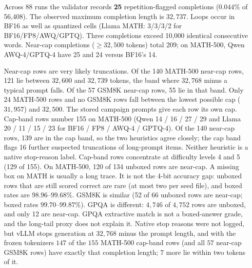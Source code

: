 \documentclass[11pt,a4paper]{article}
\begin{document}
Across 88 runs the validator records \textbf{25} repetition-flagged completions ($0.044\%$ of 56{,}408). The observed maximum completion length is $32{,}737$. Loops occur in BF16 as well as quantized cells (Llama MATH: 3/3/3/2 for BF16/FP8/AWQ/GPTQ). Three completions exceed 10{,}000 identical consecutive words. Near-cap completions ($\ge 32{,}500$ tokens) total 209; on MATH-500, Qwen AWQ-4/GPTQ-4 have 25 and 24 versus BF16's 14.

Near-cap rows are very likely truncations. Of the 140 MATH-500 near-cap rows, 121 lie between $32{,}600$ and $32{,}739$ tokens, the band where $32{,}768$ minus a typical prompt falls. Of the 57 GSM8K near-cap rows, 55 lie in that band. Only 24 MATH-500 rows and no GSM8K rows fall between the lowest possible cap ($31{,}957$) and $32{,}500$. The stored campaign prompts give each row its own cap. Cap-band rows number 155 on MATH-500 (Qwen 14 / 16 / 27 / 29 and Llama 20 / 11 / 15 / 23 for BF16 / FP8 / AWQ-4 / GPTQ-4). Of the 140 near-cap rows, 139 are in the cap band, so the two heuristics agree closely; the cap band flags 16 further suspected truncations of long-prompt items. Neither heuristic is a native stop-reason label. Cap-band rows concentrate at difficulty levels 4 and 5 (129 of 155). On MATH-500, 120 of 134 unboxed rows are near-cap. A missing box on MATH is usually a long trace. It is not the 4-bit accuracy gap: unboxed rows that are still scored correct are rare (at most two per seed file), and boxed rates are $98.96$--$99.68\%$. GSM8K is similar (52 of 66 unboxed rows are near-cap; boxed rates $99.70$--$99.87\%$). GPQA is different: $4{,}746$ of $4{,}752$ rows are unboxed, and only 12 are near-cap. GPQA extractive match is not a boxed-answer grade, and the long-tail proxy does not explain it. Native stop reasons were not logged, but vLLM stops generation at $32{,}768$ minus the prompt length, and with the frozen tokenizers $147$ of the $155$ MATH-500 cap-band rows (and all $57$ near-cap GSM8K rows) have exactly that completion length; $7$ more lie within two tokens of it.
\end{document}
